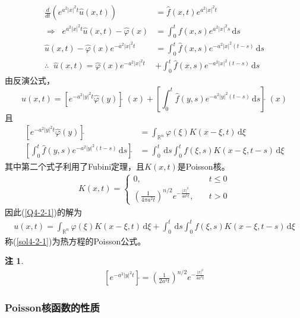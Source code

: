 \documentclass[11pt, a4paper]{article}
\theoremstyle{theorem}
\newtheorem*{note}{注}
\newcommand{\intd}[1]{\,\mathrm{d}{#1}}
\begin{document}
\begin{align*}
    \frac{d}{dt} \left(e^{a^2 |x|^2t} \hat{u}(x,t) \right) &= \hat{f}(x,t) e^{a^2 |x|^2t} \\
    \Longrightarrow \; \; e^{a^2 |x|^2t} \hat{u}(x,t) - \hat{\varphi}(x) &= \int_0^t f(x,s) e^{a^2 |x|^2 s} \intd s \\
    \hat{u}(x,t) - \hat{\varphi}(x)e^{- a^2 |x|^2t}  &= \int_0^t \hat{f}(x,s) e^{- a^2 |x|^2(t - s)} \intd s \\
    \therefore \; \; \hat{u}(x,t) = \hat{\varphi}(x)e^{- a^2 |x|^2t} &+ \int_0^t \hat{f}(x,s) e^{- a^2 |x|^2(t - s)} \intd s
\end{align*}
由反演公式，
$$
u(x,t) = \left[e^{-a^2 |y|^2t} \hat{\varphi}(y)\right]{\check{}}\; (x) + \left[ \int_0^t \hat{f}(y,s) e^{- a^2 |y|^2(t - s)} \intd s \right]\check{} \; (x)
$$
且
\begin{align*}
\left[e^{-a^2 |y|^2t} \hat{\varphi}(y)\right]{\check{}} &= \int_{\mathbb{R}^n} \varphi(\xi) K(x - \xi,t) \intd \xi \\
\left[ \int_0^t \hat{f}(y,s) e^{- a^2 |y|^2(t - s)} \intd s \right]\check{} &= \int_0^t \intd s \int_0^t f(\xi, s) K(x - \xi, t - s) \intd \xi
\end{align*}
其中第二个式子利用了Fubini定理，且$K(x,t)$是Poisson核。
\begin{align}
    K(x,t) = \begin{cases}
    0, \quad &t \leq 0 \\
    \left(\frac{1}{4\pi a^2 t}\right)^{n/2} e^{-\frac{|x|^2}{4a^2t}}, \quad &t > 0
    \end{cases}
\end{align}
因此(\ref{Q4-2-1})的解为
\begin{align}
    \label{sol4-2-1}
    u(x,t) = \int_{\mathbb{R}^n} \varphi(\xi) K(x - \xi,t) \intd \xi + \int_0^t \intd s \int_0^t f(\xi, s) K(x - \xi, t - s) \intd \xi
\end{align}
称(\ref{sol4-2-1})为热方程的Poisson公式。

\begin{note}
\begin{align}
    \left[e^{-a^2 |y|^2t}\right]{\check{}} = \left(\frac{1}{2a^2t}\right)^{n/2} e^{- \frac{|x|^2}{4a^2t}}
\end{align}
\end{note}

\subsubsection{Poisson核函数的性质}
\end{document}
